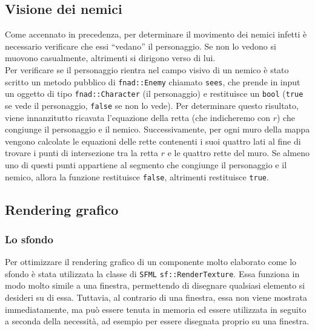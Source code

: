 \documentclass{article}
\newcommand{\quotes}[1]{``#1''}
\begin{document}
\subsection{Visione dei nemici}\label{section:vision}
Come accennato in precedenza, per determinare il movimento dei nemici infetti è necessario verificare che essi \quotes{vedano} il personaggio. Se non lo vedono si muovono casualmente, altrimenti si dirigono verso di lui.\\
Per verificare se il personaggio rientra nel campo visivo di un nemico è stato scritto un metodo pubblico di \verb|fnad::Enemy| chiamato \verb|sees|, che prende in input un oggetto di tipo \verb|fnad::Character| (il personaggio) e restituisce un \verb|bool| (\verb|true| se vede il personaggio, \verb|false| se non lo vede). Per determinare questo risultato, viene innanzitutto ricavata l'equazione della retta (che indicheremo con $r$) che congiunge il personaggio e il nemico. Successivamente, per ogni muro della mappa vengono calcolate le equazioni delle rette contenenti i suoi quattro lati al fine di trovare i punti di intersezione tra la retta $r$ e le quattro rette del muro. Se almeno uno di questi punti appartiene al segmento che congiunge il personaggio e il nemico, allora la funzione restituisce \verb|false|, altrimenti restituisce \verb|true|.

\subsection{Rendering grafico}
\subsubsection{Lo sfondo}
Per ottimizzare il rendering grafico di un componente molto elaborato come lo sfondo è stata utilizzata la classe di \verb|SFML| \verb|sf::RenderTexture|. Essa funziona in modo molto simile a una finestra, permettendo di disegnare qualsiasi elemento si desideri su di essa. Tuttavia, al contrario di una finestra, essa non viene mostrata immediatamente, ma può essere tenuta in memoria ed essere utilizzata in seguito a seconda della necessità, ad esempio per essere disegnata proprio su una finestra.
\end{document}

